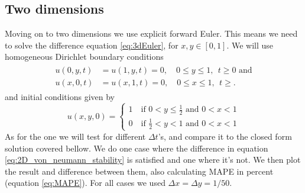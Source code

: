 \documentclass[reprint, english,notitlepage,nofootinbib]{revtex4-1}  %
\begin{document}
\subsection{Two dimensions}
Moving on to two dimensions we use explicit forward Euler. This means we need to solve the difference equation \eqref{eq:3dEuler}, for $x, y \in [0,1]$. We will use homogeneous Dirichlet boundary conditions
\begin{align}
	\label{eq:2D_bound}
	\begin{split}
	u(0, y, t) &= u(1, y, t) = 0, \quad 0\leq y \leq 1, \ \ t\geq 0 \text{ and}\\
	u(x, 0, t) &= u(x, 1, t) = 0, \quad 0\leq x \leq 1, \ \ t\geq.
	\end{split}
\end{align}
and initial conditions given by
\begin{equation}
\label{eq:2D_init}
	u(x,y,0) =
	\begin{cases}
	1\quad \text{if }0<y\leq \frac{1}{2}\text{ and } 0<x<1 \\
	0\quad \text{if }\frac{1}{2}<y<1\text{ and } 0<x<1
	\end{cases}
\end{equation}
As for the one we will test for different $\Delta t$'s, and compare it to the closed form solution covered bellow. We do one case where the difference in equation \eqref{eq:2D_von_neumann_stability} is satisfied and one where it's not. We then plot the result and difference between them, also calculating MAPE in percent (equation \eqref{eq:MAPE}). For all cases we used $\Delta x= \Delta y = 1/50$.
\end{document}
